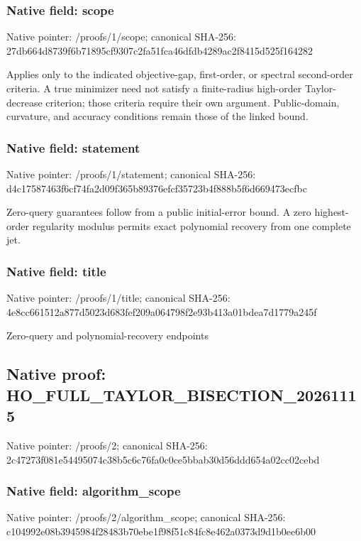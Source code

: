 \documentclass[10pt,a4paper]{article}
\begin{document}
\subsubsection{Native field: scope}
Native pointer: /proofs/1/scope; canonical SHA-256: 27db664d8739f6b71895cf9307c2fa51fca46dfdb4289ac2f8415d525f164282

\begingroup\raggedright\sloppy Applies only to the indicated objective-gap,\allowbreak{} first-order,\allowbreak{} or spectral second-order criteria. A true minimizer need not satisfy a finite-radius high-order Taylor-decrease criterion;\allowbreak{} those criteria require their own argument. Public-domain,\allowbreak{} curvature,\allowbreak{} and accuracy conditions remain those of the linked bound.\par\endgroup

\subsubsection{Native field: statement}
Native pointer: /proofs/1/statement; canonical SHA-256: d4c17587463f6cf74fa2d09f365b89376efcf35723b4f888b5f6d669473ecfbc

\begingroup\raggedright\sloppy Zero-query guarantees follow from a public initial-error bound. A zero highest-order regularity modulus permits exact polynomial recovery from one complete jet.\par\endgroup

\subsubsection{Native field: title}
Native pointer: /proofs/1/title; canonical SHA-256: 4e8cc661512a877d5023d683fef209a064798f2e93b413a01bdea7d1779a245f

\begingroup\raggedright\sloppy Zero-query and polynomial-recovery endpoints\par\endgroup

\subsection{Native proof: HO\_\allowbreak{}FULL\_\allowbreak{}TAYLOR\_\allowbreak{}BISECTION\_\allowbreak{}20261115}
Native pointer: /proofs/2; canonical SHA-256: 2c47273f081e54495074c38b5c6c76fa0c0ce5bbab30d56ddd654a02cc02cebd

\subsubsection{Native field: algorithm\_\allowbreak{}scope}
Native pointer: /proofs/2/algorithm\_\allowbreak{}scope; canonical SHA-256: c104992e08b3945984f28483b70ebe1f98f51c84fc8e462a0373d9d1b0ee6b00
\end{document}
